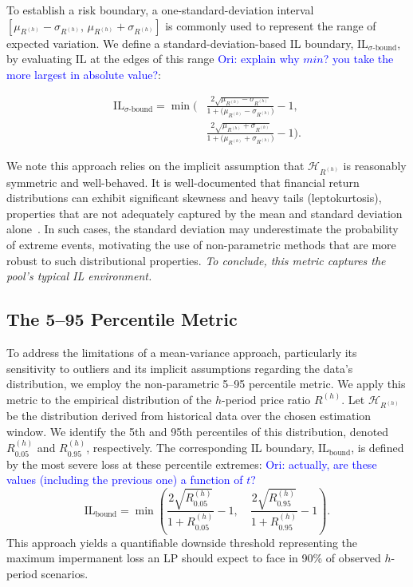 \documentclass[journal]{IEEEtran}
\newcommand{\ori}[1]{\textcolor{blue}{Ori: #1}}
\begin{document}
To establish a risk boundary, a one-standard-deviation interval \([\mu_{R^{(h)}}-\sigma_{R^{(h)}},\, \mu_{R^{(h)}}+\sigma_{R^{(h)}}]\) is commonly used to represent the range of expected variation. We define a standard-deviation-based IL boundary, \(\mathrm{IL}_{\sigma\text{-bound}}\), by evaluating IL at the edges of this range \ori{explain why $min$? you take the more largest in absolute value?}:

\begin{equation}
\label{eq:il_sigma_bound}
\begin{aligned}
\mathrm{IL}_{\sigma\text{-bound}}
= \min\Biggl(
&\frac{2\sqrt{\mu_{R^{(h)}} - \sigma_{R^{(h)}}}}{1+\bigl(\mu_{R^{(h)}} - \sigma_{R^{(h)}}\bigr)} - 1, \\
&\frac{2\sqrt{\mu_{R^{(h)}} + \sigma_{R^{(h)}}}}{1+\bigl(\mu_{R^{(h)}} + \sigma_{R^{(h)}}\bigr)} - 1
\Biggr).
\end{aligned}
\end{equation}


We note this approach relies on the implicit assumption that \(\mathcal{H}_{R^{(h)}}\) is reasonably symmetric and well-behaved. 
It is well-documented that financial return distributions can exhibit significant skewness and heavy tails (leptokurtosis), properties that are not adequately captured by the mean and standard deviation alone~\cite{mandelbrot2004fractals}. In such cases, the standard deviation may underestimate the probability of extreme events, motivating the use of non-parametric methods that are more robust to such distributional properties.
\textit{To conclude, this metric captures the pool’s \emph{typical} IL environment.}

\subsection{The 5--95 Percentile Metric}

To address the limitations of a mean-variance approach, particularly its sensitivity to outliers and its implicit assumptions regarding the data's distribution, we employ the non-parametric 5--95 percentile metric. 
We apply this metric to the empirical distribution of the \(h\)-period price ratio \(R^{(h)}\). Let \(\mathcal{H}_{R^{(h)}}\) be the distribution derived from historical data over the chosen estimation window. We identify the 5th and 95th percentiles of this distribution, denoted \(R^{(h)}_{0.05}\) and \(R^{(h)}_{0.95}\), respectively. The corresponding IL boundary, \(\mathrm{IL}_{\text{bound}}\), is defined by the most severe loss at these percentile extremes:
\ori{actually, are these values (including the previous one) a function of $t$?}
\begin{equation}
\label{eq:il_bound}
\mathrm{IL}_{\text{bound}} = \min\left(
\frac{2\sqrt{R^{(h)}_{0.05}}}{1+R^{(h)}_{0.05}} - 1,\quad
\frac{2\sqrt{R^{(h)}_{0.95}}}{1+R^{(h)}_{0.95}} - 1
\right).
\end{equation}
This approach yields a quantifiable downside threshold representing the maximum impermanent loss an LP should expect to face in 90\% of observed \(h\)-period scenarios.
\end{document}
